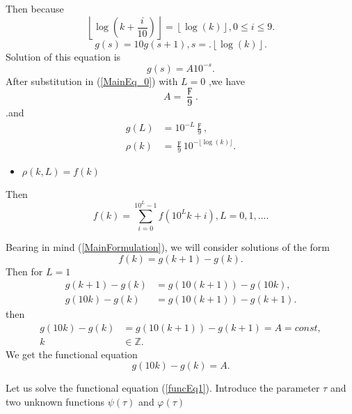 \documentclass[titlepage,fleqn]{article}%
\providecommand{\U}[1]{\protect\rule{.1in}{.1in}}
\begin{document}
Then because%
\[
\left\lfloor \log\left(  k+\frac{i}{10}\right)  \right\rfloor =\left\lfloor
\log(k)\right\rfloor ,0\leq i\leq9.
\]%
\[
g(s)=10g(s+1),s=.\left\lfloor \log(k)\right\rfloor .
\]
Solution of this equation is%
\[
g(s)=A10^{-s}.
\]
After substitution in (\ref{MainEq_0}) with $L=0$ ,we have
\[
A=\frac{\digamma}{9}.
\]
.and%
\begin{align}
g(L)  &  =10^{-L}\frac{\digamma}{9},\label{SolL}\\
\rho(k)  &  =\frac{\digamma}{9}10^{-\lfloor\log(k)\rfloor}.\nonumber
\end{align}


\begin{itemize}
\item $\rho(k,L)=f(k)$
\end{itemize}

Then%
\begin{equation}
f(k)=%
{\displaystyle\sum\limits_{i=0}^{10^{L}-1}}
f(10^{L}k+i),L=0,1,\ldots. \label{SolEq2}%
\end{equation}


Bearing in mind (\ref{MainFormulation}), we will consider solutions of the
form%
\begin{equation}
f(k)=g(k+1)-g(k). \label{Sdiff1}%
\end{equation}
Then for $L=1$
\begin{align*}
g(k+1)-g(k)  &  =g(10(k+1))-g(10k),\\
g(10k)-g(k)  &  =g(10(k+1))-g(k+1).
\end{align*}
then
\begin{align*}
g(10k)-g(k)  &  =g(10(k+1))-g(k+1)=A=const,\\
k  &  \in%
\mathbb{Z}
.
\end{align*}
We get the functional equation
\begin{equation}
g(10k)-g(k)=A. \label{funcEq1}%
\end{equation}


Let us solve the functional equation (\ref{funcEq1}). Introduce the parameter
$\tau$ and two unknown functions $\psi(\tau)$ and $\varphi(\tau)$%
\end{document}
